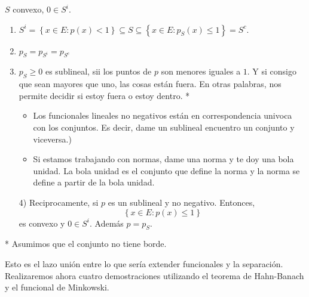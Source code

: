 \begin{paracol}{2}
\begin{prop}
    $S$ convexo, $0\in S^i$.
    \begin{enumerate}[1)]
	\item $S^i=\left\{x\in E: p(x) < 1 \right\}\subseteq S \subseteq \left\{x\in E:p_S(x)\leq 1\right\}=S^c$.
	\item $p_S=p_{S^i}=p_{S^c}$
	\item $p_S\geq 0$ es sublineal, sii los puntos de $p$ son menores iguales a $1$. Y si consigo que sean mayores que uno, las cosas están fuera. En otras palabras, nos permite decidir si estoy fuera o estoy dentro.
	\switchcolumn[1]*{\noindent\scriptsize
	    \begin{itemize}
		\item Los funcionales lineales no negativos están en correspondencia univoca con los conjuntos. Es decir, dame un sublineal encuentro un conjunto y viceversa.) 
		\item Si estamos trabajando con normas, dame una norma y te doy una bola unidad. La bola unidad es el conjunto que define la norma y la norma se define a partir de la bola unidad.
	    \end{itemize}
	}
	\switchcolumn[0]\noindent
	\item[4)] Reciprocamente, si $p$ es un sublineal y no negativo. Entonces, 
	    $$\left\{x\in E: p(x)\leq 1\right\}$$
	    es convexo y $0\in S^i$. Además $p=p_S$. 
    \end{enumerate}
\end{prop}

\switchcolumn[1]*{\noindent\scriptsize
    Asumimos que el conjunto no tiene borde.
}
\switchcolumn[0]\noindent
\begin{tcolorbox}[colframe=white]
    Esto es el lazo unión entre lo que sería extender funcionales y la separación. Realizaremos ahora cuatro demostraciones utilizando el teorema de Hahn-Banach y el funcional de Minkowski.
\end{tcolorbox}


\end{paracol}
